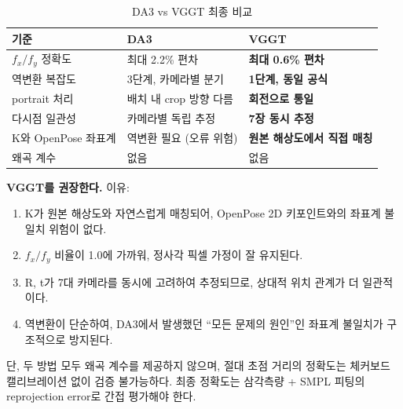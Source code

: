 \documentclass[11pt, a4paper]{report}
\begin{document}
\begin{table}[H]
\centering
\caption{DA3 vs VGGT 최종 비교}
\renewcommand{\arraystretch}{1.4}
\begin{tabular}{p{4cm} p{5cm} p{5cm}}
\toprule
\textbf{기준} & \textbf{DA3} & \textbf{VGGT} \\
\midrule
$f_x/f_y$ 정확도 & 최대 2.2\% 편차 & \textbf{최대 0.6\% 편차} \\
역변환 복잡도 & 3단계, 카메라별 분기 & \textbf{1단계, 동일 공식} \\
portrait 처리 & 배치 내 crop 방향 다름 & \textbf{회전으로 통일} \\
다시점 일관성 & 카메라별 독립 추정 & \textbf{7장 동시 추정} \\
K와 OpenPose 좌표계 & 역변환 필요 (오류 위험) & \textbf{원본 해상도에서 직접 매칭} \\
왜곡 계수 & 없음 & 없음 \\
\bottomrule
\end{tabular}
\end{table}

\begin{summary}
\textbf{VGGT를 권장한다.} 이유:
\begin{enumerate}[leftmargin=*]
  \item K가 원본 해상도와 자연스럽게 매칭되어, OpenPose 2D 키포인트와의 좌표계 불일치 위험이 없다.
  \item $f_x/f_y$ 비율이 1.0에 가까워, 정사각 픽셀 가정이 잘 유지된다.
  \item R, t가 7대 카메라를 동시에 고려하여 추정되므로, 상대적 위치 관계가 더 일관적이다.
  \item 역변환이 단순하여, DA3에서 발생했던 ``모든 문제의 원인''인 좌표계 불일치가 구조적으로 방지된다.
\end{enumerate}

단, 두 방법 모두 왜곡 계수를 제공하지 않으며, 절대 초점 거리의 정확도는 체커보드 캘리브레이션 없이 검증 불가능하다. 최종 정확도는 삼각측량 + SMPL 피팅의 reprojection error로 간접 평가해야 한다.
\end{summary}
\end{document}
